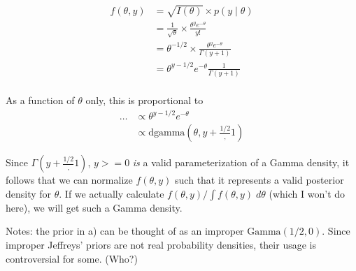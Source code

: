 \documentclass[
]{article}
\begin{document}
\begin{align}
f(\theta, y) &= \sqrt{I(\theta)} \times p(y \mid \theta) \\
&= \frac{1}{\sqrt{\theta}} \times  \frac{\theta^y e^{-\theta}}{y!} \\
&= \theta^{-1/2} \times  \frac{\theta^y e^{-\theta}}{\Gamma(y + 1)} \\
&= \theta^{y - 1/2} e^{-\theta} \frac{1}{\Gamma(y + 1)} \\
\end{align}

As a function of \(\theta\) only, this is proportional to \begin{align}
\dots &\propto \theta^{y - 1/2} e^{-\theta} \\
&\propto \text{dgamma}(\theta, y + \frac{1/2}, 1)
\end{align}

Since \(\Gamma(y + \frac{1/2}, 1)\), \(y >= 0\) \emph{is} a valid
parameterization of a Gamma density, it follows that we can normalize
\(f(\theta, y)\) such that it represents a valid posterior density for
\(\theta\). If we actually calculate
\(f(\theta, y) / \int f(\theta, y) \; d\theta\) (which I won't do here),
we will get such a Gamma density.

Notes: the prior in a) can be thought of as an improper
\(\text{Gamma}(1/2, 0)\). Since improper Jeffreys' priors are not real
probability densities, their usage is controversial for some. (Who?)
\end{document}
